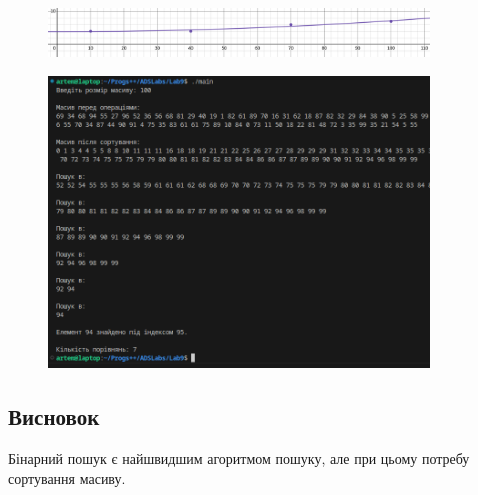 \documentclass[12pt]{extarticle}
\begin{document}
\vspace{12pt}
\begin{figure}[H]
    \centering
    \includegraphics[width=0.90\textwidth]{graph.png}
    \caption{}
\end{figure}
\begin{figure}[H]
    \centering
    \includegraphics[width=0.90\textwidth]{log.png}
    \caption{}
\end{figure}

\subsection*{Висновок} 
Бінарний пошук є найшвидшим агоритмом пошуку, але при цьому потребу сортування масиву.
\end{document}
